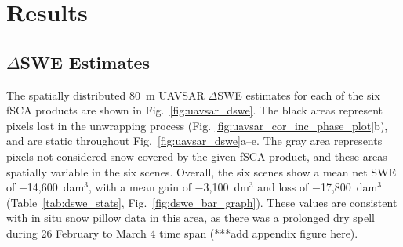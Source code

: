 \hypertarget{ch4-results}{\section{Results}\label{ch4-results}}
\hypertarget{ch4-results}{\subsection{$\Delta$SWE Estimates}\label{ch4-results}}

The spatially distributed 80~m UAVSAR $\Delta$SWE estimates for each of the six fSCA products are shown in Fig.~\ref{fig:uavsar_dswe}. The black areas represent pixels lost in the unwrapping process (Fig. \ref{fig:uavsar_cor_inc_phase_plot}b), and are static throughout Fig.~\ref{fig:uavsar_dswe}a--e. The gray area represents pixels not considered snow covered by the given fSCA product, and these areas spatially variable in the six scenes. Overall, the six scenes show a mean net SWE of $-$14,600~dam$^{3}$, with a mean gain of $-$3,100~dm$^{3}$ and loss of $-$17,800~dam$^{3}$ (Table~\ref{tab:dswe_stats}, Fig.~\ref{fig:dswe_bar_graph}). These values are consistent with in situ snow pillow data in this area, as there was a prolonged dry spell during 26 February to March 4 time span (***add appendix figure here).

